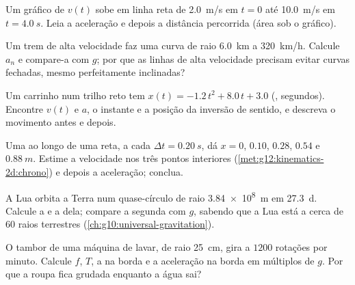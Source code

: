 \begin{exercise}[$\star$]\label{exo:g12:kinematics-2d:5}
Um gráfico de $v(t)$ sobe em linha reta de \qty{2.0}{m/s} em $t = 0$ até
\qty{10.0}{m/s} em $t = \qty{4.0}{s}$. Leia a aceleração e depois a
distância percorrida (área sob o gráfico).
\end{exercise}

\begin{exercise}[$\star\star$]\label{exo:g12:kinematics-2d:6}
Um trem de alta velocidade faz uma curva de raio \qty{6.0}{km} a
\qty{320}{km/h}. Calcule $a_n$ e compare-a com $g$; por que as linhas de
alta velocidade precisam evitar curvas fechadas, mesmo perfeitamente
inclinadas?
\end{exercise}

\begin{exercise}[$\star\star$]\label{exo:g12:kinematics-2d:7}
Um carrinho num trilho reto tem $x(t) = -1.2\,t^2 + 8.0\,t + 3.0$
(, segundos). Encontre $v(t)$ e $a$, o instante e a posição da
inversão de sentido, e descreva o movimento antes e depois.
\end{exercise}

\begin{exercise}[$\star\star$]\label{exo:g12:kinematics-2d:8}
Uma  ao longo de uma reta, a cada
$\Delta t = \qty{0.20}{s}$, dá $x = 0$, $0.10$, $0.28$, $0.54$ e
$\qty{0.88}{m}$. Estime a velocidade nos três pontos interiores
(\cref{met:g12:kinematics-2d:chrono}) e depois a aceleração; conclua.
\end{exercise}

\begin{exercise}[$\star\star$]\label{exo:g12:kinematics-2d:9}
A Lua orbita a Terra num quase-círculo de raio \qty{3.84e8}{m} em
\qty{27.3}{d}. Calcule a  e a 
dela; compare a segunda com $g$, sabendo que a Lua está a cerca de $60$
raios terrestres (\cref{ch:g10:universal-gravitation}).
\end{exercise}

\begin{exercise}[$\star\star$]\label{exo:g12:kinematics-2d:10}
O tambor de uma máquina de lavar, de raio \qty{25}{cm}, gira a $1200$
rotações por minuto. Calcule $f$, $T$, a  na borda e a
aceleração na borda em múltiplos de $g$. Por que a roupa fica grudada
enquanto a água sai?
\end{exercise}

